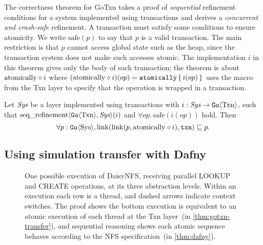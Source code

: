 The correctness theorem for GoTxn takes a proof of \emph{sequential} refinement
conditions for a system implemented using transactions and derives a \emph{concurrent and crash-safe} refinement.
A transaction must satisfy some conditions to ensure atomicity. We write
$\mathrm{safe}(p)$ to say that $p$ is a valid transaction. The main
restriction is that $p$ cannot access global state such as the heap, since
the transaction system does not make such accesses atomic.
The implementation $i$
in this theorem gives only the body of each transaction; the theorem is about
$\mathrm{atomically}\circ i$ where $(\mathrm{atomically}\circ i)(op) = \mathtt{atomically}\,\{\, i(op) \,\}$ uses
the macro from the Txn layer to specify that the
operation is wrapped in a transaction.
\begin{theorem}
  Let $\textit{Sys}$ be a layer implemented using transactions with
$i : \textit{Sys} \to \mathtt{Go}\langle \mathrm{Txn} \rangle$, such that
$\operatorname{seq\_refinement}\langle \mathtt{Go}\langle \mathrm{Txn} \rangle, \textit{Sys} \rangle(i)$ and
$\forall op.\, \mathrm{safe}(i(op))$ hold. Then
\[
  \forall p : \mathtt{Go}\langle \mathrm{Sys} \rangle, \mathrm{link}(\mathrm{link}(p, \mathrm{atomically}\circ i), \texttt{txn}) \sqsubseteq p.
\]
\label{thm:gotxn-transfer}
\end{theorem}

\subsection{Using simulation transfer with Dafny}

\begin{figure}
  \begin{center}
  
  \end{center}
  \caption[One execution of DaisyNFS at its three abstraction levels]{One possible execution of DaisyNFS, receiving parallel LOOKUP and
    CREATE operations, at its three abstraction levels.
    Within an execution each row is a thread, and dashed arrows indicate
    context switches.
    The proof shows the bottom execution is equivalent to an atomic execution of
    each thread at
    the Txn layer~(in \cref{thm:gotxn-transfer}),
    and sequential reasoning shows each atomic sequence behaves according to the NFS
    specification~(in \cref{thm:dafny}).}
  \label{fig:refinement-execs}
\end{figure}

